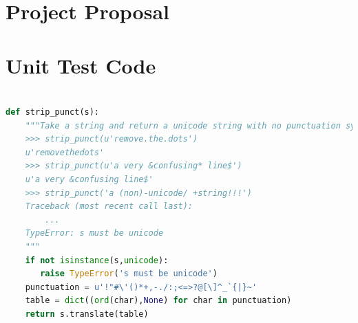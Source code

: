 \documentclass[12pt,a4paper,notitlepage,twoside]{scrbook}
\begin{document}


\appendix

\chapter{Project Proposal}
\label{prop}



\chapter{Unit Test Code}
\label{app:testing}
\usepackage{listings}
\begin{lstlisting}[language=python]

def strip_punct(s):
    """Take a string and return a unicode string with no punctuation symbols.
    >>> strip_punct(u'remove.the.dots')
    u'removethedots'
    >>> strip_punct(u'a very &confusing* line$')
    u'a very &confusing line$'
    >>> strip_punct('a (non)-unicode/ +string!!!')
    Traceback (most recent call last):
        ...
    TypeError: s must be unicode
    """
    if not isinstance(s,unicode):
       raise TypeError('s must be unicode')
    punctuation = u'!"#\'()*+,-./:;<=>?@[\]^_`{|}~'
    table = dict((ord(char),None) for char in punctuation)
    return s.translate(table)

\end{lstlisting}
\end{document}
